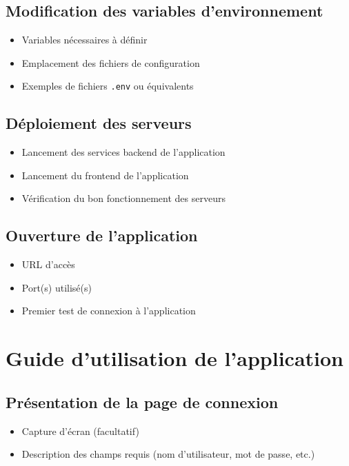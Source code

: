 \documentclass[12pt]{article}
\begin{document}
        \subsection{Modification des variables d’environnement}
            \begin{itemize}[label=--]
                \item Variables nécessaires à définir
                \item Emplacement des fichiers de configuration
                \item Exemples de fichiers \texttt{.env} ou équivalents
            \end{itemize}
        \subsection{Déploiement des serveurs}
            \begin{itemize}[label=--]
                \item Lancement des services backend de l'application
                \item Lancement du frontend de l'application
                \item Vérification du bon fonctionnement des serveurs
            \end{itemize}
        \subsection{Ouverture de l’application}
            \begin{itemize}[label=--]
                \item URL d’accès
                \item Port(s) utilisé(s)
                \item Premier test de connexion à l’application
            \end{itemize}

    \section{Guide d’utilisation de l’application}
        \subsection{Présentation de la page de connexion}
            \begin{itemize}[label=--]
                \item Capture d’écran (facultatif)
                \item Description des champs requis (nom d’utilisateur, mot de passe, etc.)
            \end{itemize}
\end{document}
